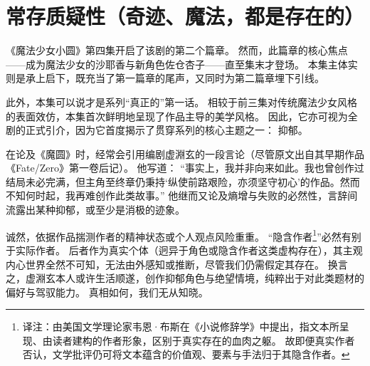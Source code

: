 \chapter[常存质疑性（奇迹、魔法，都是存在的）]{常存质疑性\protect\footnotemark（奇迹、魔法，都是存在的）}


《魔法少女小圆》第四集开启了该剧的第二个篇章。
然而，此篇章的核心焦点——成为魔法少女的沙耶香与新角色佐仓杏子——直至集末才登场。
本集主体实则是承上启下，既充当了第一篇章的尾声，又同时为第二篇章埋下引线。

此外，本集可以说才是系列“真正的”第一话。
相较于前三集对传统魔法少女风格的表面效仿，本集首次鲜明地呈现了作品主导的美学风格。
因此，它亦可视为全剧的正式引介，因为它首度揭示了贯穿系列的核心主题之一：
抑郁。

在论及《魔圆》时，经常会引用编剧虚淵玄的一段言论（尽管原文出自其早期作品《Fate/Zero》第一卷后记）。
他写道：
“事实上，我并非向来如此。我也曾创作过结局未必完满，但主角至终章仍秉持‘纵使前路艰险，亦须坚守初心’的作品。然而不知何时起，我再难创作此类故事。”
\cite{ref29} 他继而又论及熵增与失败的必然性，言辞间流露出某种抑郁，或至少是消极的迹象。

诚然，依据作品揣测作者的精神状态或个人观点风险重重。
“隐含作者\footnote{%
    译注：由美国文学理论家韦恩·布斯在《小说修辞学》中提出，指文本所呈现、由读者建构的作者形象，区别于真实存在的血肉之躯。
    故即便真实作者否认，文学批评仍可将文本蕴含的价值观、要素与手法归于其隐含作者。
}”必然有别于实际作者\cite{ref30}。
后者作为真实个体（迥异于角色或隐含作者这类虚构存在），其主观内心世界全然不可知，无法由外感知或推断，尽管我们仍需假定其存在。
换言之，虚淵玄本人或许生活顺遂，创作抑郁角色与绝望情境，纯粹出于对此类题材的偏好与驾驭能力。
真相如何，我们无从知晓。

